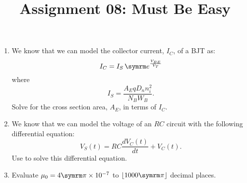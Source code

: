 \documentclass{article}
\title{Assignment 08: Must Be Easy}
\begin{document}
\renderTitle

\begin{enumerate}[leftmargin=*]
	\item
		We know that we can model the collector current,
		\(I_C\), of a BJT as:
		\begin{equation}
			I_C = I_S \, \e^{\frac{V_{BE}}{V_T}}
		\end{equation}
		where
		\begin{equation}
			I_S = \frac{A_E q D_n n_i^2}{N_B W_B}.
		\end{equation}
		Solve for the cross section area, \(A_E\), in terms of
		\(I_C\).

	\item
		We know that we can model the voltage of an \(RC\)
		circuit with the following differential equation:
		\begin{equation}
			V_S(t) = RC \frac{d V_C(t)}{dt} + V_C(t).
		\end{equation}
		Use  to solve this differential
		equation.

	\item
		Evaluate \(\mu_0 = 4 \cpi \times 10^{-7}\) to \(\lfloor
		1000 \cpi \rfloor\) decimal places.

\end{enumerate}
\end{document}

